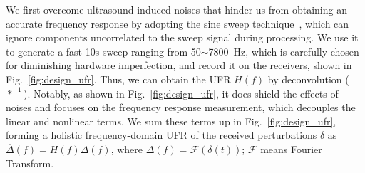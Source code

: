 We first overcome ultrasound-induced noises that hinder us from obtaining an accurate frequency response by adopting the sine sweep technique~\cite{farina2007advancements}, which can ignore components uncorrelated to the sweep signal during processing. We use it to generate a fast 10s sweep ranging from 50$\sim$7800~Hz, which is carefully chosen for diminishing hardware imperfection, and record it on the receivers, shown in Fig.~\ref{fig:design_ufr}. 
Thus, we can obtain the UFR $H(f)$ by deconvolution ($\ast^{-1}$). Notably, as shown in Fig.~\ref{fig:design_ufr}, it does shield the effects of noises and focuses on the frequency response measurement, which decouples the linear and nonlinear terms. We sum these terms up in Fig.~\ref{fig:design_ufr}, forming a holistic frequency-domain UFR of the received perturbations $\delta$ as $\overline{\Delta}(f)=H(f)\Delta(f)$, where $\Delta(f)=\mathcal{F}(\delta(t))$; $\mathcal{F}$ means Fourier Transform.


